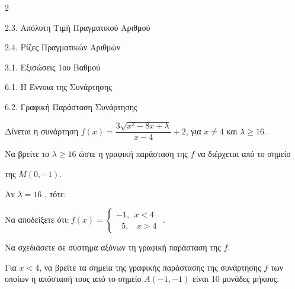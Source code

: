 \begin{ylh}{2}
    \item 2.3. Απόλυτη Τιμή Πραγματικού Αριθμού
    \item 2.4. Ρίζες Πραγματικών Αριθμών
    \item 3.1. Εξισώσεις 1ου Βαθμού
    \item 6.1. Η Έννοια της Συνάρτησης
    \item 6.2. Γραφική Παράσταση Συνάρτησης
\end{ylh}
Δίνεται η συνάρτηση $f(x) = \dfrac{3\sqrt{x^{2} - 8x + \lambda}}{x - 4} + 2$, για $x \neq 4$ και $\lambda \geq 16$.

\begin{alist}
\item Να βρείτε το $\lambda \geq 16$ ώστε η γραφική παράσταση της $f$ να διέρχεται από το σημείο

της $M(0, - 1)$.
\item Αν $\lambda = 16$ , τότε:
\begin{rlist}
\item
  Να αποδείξετε ότι:\(\ f(x) = \left\{ \begin{array}{r}
   - 1,\ \ x < 4\ \  \\
  \ \ \ 5,\ \ \ \ x > 4
  \end{array} \right.\ \).
\item
  Να σχεδιάσετε σε σύστημα αξόνων τη γραφική παράσταση της $f.$
\item
  Για $x < 4$, να βρείτε τα σημεία της γραφικής παράστασης της συνάρτησης $f$ των οποίων η απόστασή τους από το σημείο $A( - 1, - 1)$ είναι 10 μονάδες μήκους.
\end{rlist}
\end{alist}

